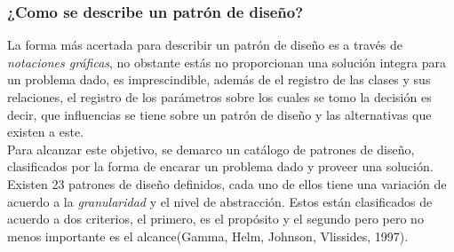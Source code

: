 \subsubsection {¿Como se describe un patrón de diseño?}
\noindent La forma más acertada para describir un patrón de diseño es a través de \textit {notaciones gráficas},
\noindent no obstante estás no proporcionan una solución integra para un problema dado, es imprescindible, además de
\noindent el registro de las clases y sus relaciones, el registro de los parámetros sobre los cuales se tomo la decisión
\noindent es decir, que influencias se tiene sobre un patrón de diseño y las alternativas que existen a este.\\
\noindent Para alcanzar este objetivo, se demarco un catálogo de patrones de diseño, clasificados por la forma de encarar
\noindent un problema dado y proveer una solución.\\
\noindent Existen 23 patrones de diseño definidos, cada uno de ellos tiene una variación de acuerdo a la \textit{granularidad}
\noindent y el nivel de abstracción.
\noindent Estos están clasificados de acuerdo a dos criterios, el primero, es el propósito y el segundo pero
\noindent pero no menos importante es el alcance(Gamma, Helm, Johnson, Vlissides, 1997).\\

